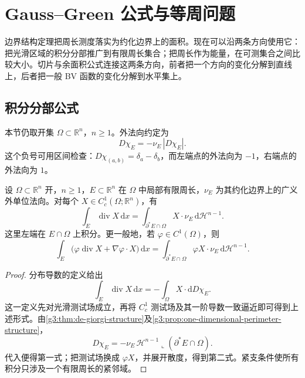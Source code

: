 
% 
% 
% 

\section{Gauss–Green 公式与等周问题}
\label{g3:sec:2105}

边界结构定理把周长测度落实为约化边界上的面积。现在可以沿两条方向使用它：把光滑区域的积分分部推广到有限周长集合；把周长作为能量，在可测集合之间比较大小。切片与余面积公式连接这两条方向，前者把一个方向的变化分解到直线上，后者把一般 BV 函数的变化分解到水平集上。

\subsection{积分分部公式}
\label{g3:subsec:2105:01}
本节仍取开集 \(\Omega\subset\mathbb R^n\)，\(n\ge1\)。外法向约定为
\[
	D\chi_E=-\nu_E\,|D\chi_E|.
\]
这个负号可用区间检查：\(D\chi_{(a,b)}=\delta_a-\delta_b\)，而左端点的外法向为 \(-1\)，右端点的外法向为 \(1\)。

\begin{theorem}\label{g3:thm:finite-perimeter-gauss-green}
	设 \(\Omega\subset\mathbb R^n\) 开，\(n\ge1\)，\(E\subset\mathbb R^n\) 在 \(\Omega\) 中局部有限周长，\(\nu_E\) 为其约化边界上的广义外单位法向。对每个 \(X\in C_c^1(\Omega;\mathbb R^n)\)，有
	\begin{equation}\label{g3:eq:finite-perimeter-gauss-green}
		\int_E\operatorname{div}X\,\mathrm dx
		=\int_{\partial^*E\cap\Omega}X\cdot\nu_E\,\mathrm d\mathcal H^{n-1}.
	\end{equation}
	这里左端在 \(E\cap\Omega\) 上积分。更一般地，若 \(\varphi\in C^1(\Omega)\)，则
	\[
		\int_E\bigl(\varphi\operatorname{div}X+\nabla\varphi\cdot X\bigr)\,\mathrm dx
		=\int_{\partial^*E\cap\Omega}\varphi X\cdot\nu_E\,\mathrm d\mathcal H^{n-1}.
	\]
\end{theorem}
\begin{proof}
	分布导数的定义给出
	\[
		\int_E\operatorname{div}X\,\mathrm dx=-\int_\Omega X\cdot\mathrm dD\chi_E.
	\]
	这一定义先对光滑测试场成立，再将 \(C_c^1\) 测试场及其一阶导数一致逼近即可得到上述形式。由\cref{g3:thm:de-giorgi-structure}及\cref{g3:prop:one-dimensional-perimeter-structure}，
	\[
		D\chi_E=-\nu_E\,\mathcal H^{n-1}\!\llcorner(\partial^*E\cap\Omega).
	\]
	代入便得第一式；把测试场换成 \(\varphi X\)，并展开散度，得到第二式。紧支条件使所有积分只涉及一个有限周长的紧邻域。
\end{proof}

